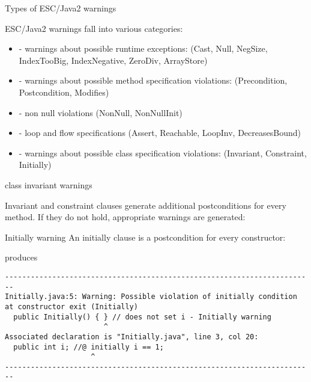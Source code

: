 \documentclass[
pdf,
nocolorBG,
slideColor,
cok,
]{prosper}
\begin{document}
\begin{slide}{Types of ESC/Java2 warnings}
\vspace*{-6ex}

ESC/Java2 warnings fall into various categories:
\begin{itemize}
\item[] - {\gray warnings about possible { runtime exceptions}:
(Cast, Null, NegSize, IndexTooBig, IndexNegative, ZeroDiv, ArrayStore)}


\item[] - {\gray warnings about possible method { specification violations}:
(Precondition, Postcondition, Modifies)}

\item[] - {\gray non null violations (NonNull, NonNullInit)}

\item[] - {\gray loop and flow specifications (Assert, Reachable, LoopInv, DecreasesBound)}

\item[] - { warnings about possible class specification violations}:
(Invariant, Constraint, Initially)

\end{itemize}
\end{slide}
\begin{slide}{class invariant warnings}


\vspace*{-6ex}
Invariant and constraint clauses generate additional postconditions for every method.
If they do not hold, appropriate warnings are generated:

\begin{figure*}
\tiny

\end{figure*}
\end{slide}

\begin{slide}{Initially warning}
\vspace*{-6ex}
An initially clause is a postcondition for every constructor:

\begin{figure*}
\tiny


\end{figure*}
produces
\tiny

\begin{verbatim}
------------------------------------------------------------------------
Initially.java:5: Warning: Possible violation of initially condition 
at constructor exit (Initially)
  public Initially() { } // does not set i - Initially warning
                       ^
Associated declaration is "Initially.java", line 3, col 20:
  public int i; //@ initially i == 1;
                    ^
------------------------------------------------------------------------
\end{verbatim}
\end{slide}
\end{document}
